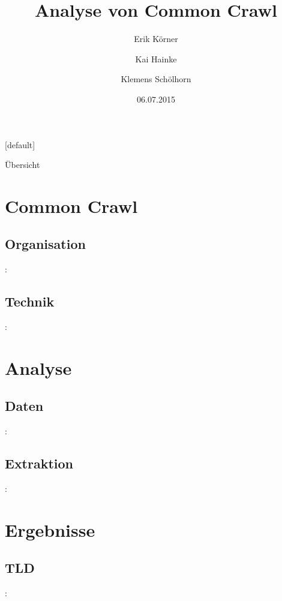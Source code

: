 \documentclass[12pt, utf8, ngerman]{beamer}
\title{Analyse von Common Crawl}
\author{Erik Körner \and Kai Hainke \and Klemens Schölhorn}
\date{06.07.2015}
\begin{document}
{
    [default]
    \begin{frame}
        \titlepage
    \end{frame}
}

\begin{frame}{Übersicht}
    \tableofcontents
\end{frame}


\section{Common Crawl}

\subsection{Organisation}
\begin{frame}{\insertsection: \insertsubsection}
\end{frame}

\subsection{Technik}
\begin{frame}{\insertsection: \insertsubsection}
\end{frame}


\section{Analyse}

\subsection{Daten}
\begin{frame}{\insertsection: \insertsubsection}
\end{frame}

\subsection{Extraktion}
\begin{frame}{\insertsection: \insertsubsection}
\end{frame}


\section{Ergebnisse}

\subsection{TLD}
\begin{frame}{\insertsection: \insertsubsection}
\end{frame}
\end{document}
